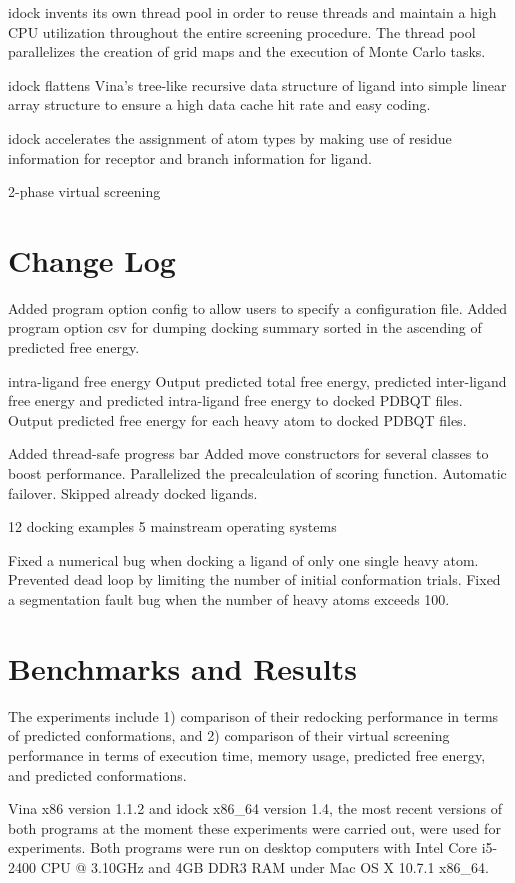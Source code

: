 \documentclass[10pt,conference,compsocconf]{../IEEEtran}
\begin{document}
idock invents its own thread pool in order to reuse threads and maintain a high CPU utilization throughout the entire screening procedure. The thread pool parallelizes the creation of grid maps and the execution of Monte Carlo tasks.

idock flattens Vina's tree-like recursive data structure of ligand into simple linear array structure to ensure a high data cache hit rate and easy coding.

idock accelerates the assignment of atom types by making use of residue information for receptor and branch information for ligand.

2-phase virtual screening

\section{Change Log}

Added program option config to allow users to specify a configuration file.
Added program option csv for dumping docking summary sorted in the ascending of predicted free energy.

intra-ligand free energy
Output predicted total free energy, predicted inter-ligand free energy and predicted intra-ligand free energy to docked PDBQT files. Output predicted free energy for each heavy atom to docked PDBQT files.

Added thread-safe progress bar
Added move constructors for several classes to boost performance.
Parallelized the precalculation of scoring function.
Automatic failover. Skipped already docked ligands.

12 docking examples
5 mainstream operating systems

Fixed a numerical bug when docking a ligand of only one single heavy atom.
Prevented dead loop by limiting the number of initial conformation trials.
Fixed a segmentation fault bug when the number of heavy atoms exceeds 100.

\section{Benchmarks and Results}

The experiments include 1) comparison of their redocking performance in terms of predicted conformations, and 2) comparison of their virtual screening performance in terms of execution time, memory usage, predicted free energy, and predicted conformations.

Vina x86 version 1.1.2 and idock x86\_64 version 1.4, the most recent versions of both programs at the moment these experiments were carried out, were used for experiments. Both programs were run on desktop computers with Intel Core i5-2400 CPU @ 3.10GHz and 4GB DDR3 RAM under Mac OS X 10.7.1 x86\_64.
\end{document}
